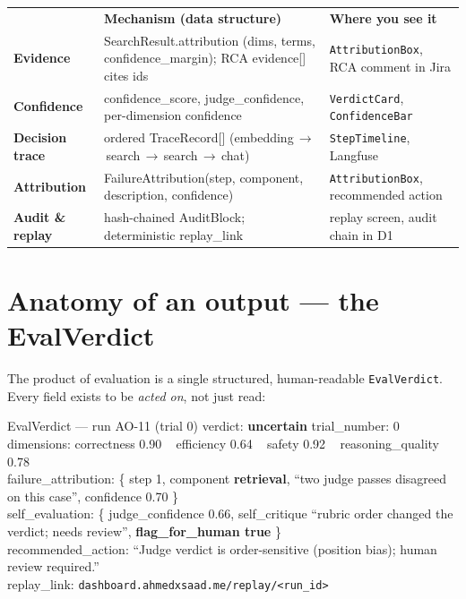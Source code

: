 \documentclass[11pt]{article}
\newcommand{\dt}{\,\textperiodcentered\,}
\newcommand{\fld}[1]{{\ttfamily\color{emdark}#1}}
\begin{document}
\begin{center}
\begin{tabular}{@{}>{\bfseries}p{3.0cm} p{6.4cm} p{5.0cm}@{}}
\toprule
\rowcolor{headerbg}\multicolumn{1}{@{}>{\bfseries\color{white}}l}{Pillar} & \color{white}\bfseries Mechanism (data structure) & \color{white}\bfseries Where you see it \\
Evidence & \fld{SearchResult.attribution} (dims, terms, confidence\_margin); RCA \fld{evidence[]} cites ids & \texttt{AttributionBox}, RCA comment in Jira \\
Confidence & \fld{confidence\_score}, \fld{judge\_confidence}, per-dimension \fld{confidence} & \texttt{VerdictCard}, \texttt{ConfidenceBar} \\
Decision trace & ordered \fld{TraceRecord[]} (embedding\,$\to$\,search\,$\to$\,search\,$\to$\,chat) & \texttt{StepTimeline}, Langfuse \\
Attribution & \fld{FailureAttribution}(step, component, description, confidence) & \texttt{AttributionBox}, recommended action \\
Audit \& replay & hash-chained \fld{AuditBlock}; deterministic \fld{replay\_link} & replay screen, audit chain in D1 \\
\bottomrule
\end{tabular}
\end{center}

\section{Anatomy of an output --- the EvalVerdict}
The product of evaluation is a single structured, human-readable \texttt{EvalVerdict}. Every
field exists to be \emph{acted on}, not just read:

\begin{artifact}{EvalVerdict --- run AO-11 (trial 0)}
\fld{verdict}: \textbf{uncertain} \hfill \fld{trial\_number}: 0\\[2pt]
\fld{dimensions}: correctness 0.90 \dt\ efficiency 0.64 \dt\ safety 0.92 \dt\ reasoning\_quality 0.78\\[2pt]
\fld{failure\_attribution}: \{ step 1, component \textbf{retrieval}, ``two judge passes disagreed
on this case'', confidence 0.70 \}\\[2pt]
\fld{self\_evaluation}: \{ judge\_confidence 0.66, self\_critique ``rubric order changed the
verdict; needs review'', \textbf{flag\_for\_human true} \}\\[2pt]
\fld{recommended\_action}: ``Judge verdict is order-sensitive (position bias); human review
required.''\\[2pt]
\fld{replay\_link}: \texttt{dashboard.ahmedxsaad.me/replay/<run\_id>}
\end{artifact}
\end{document}
